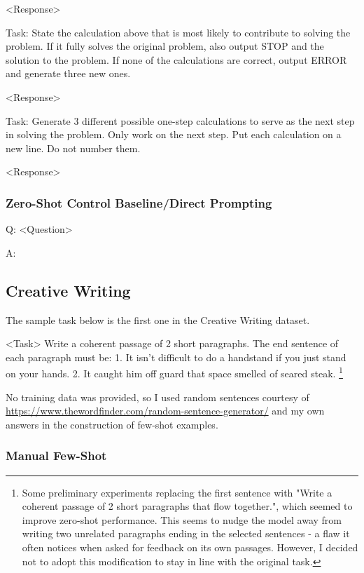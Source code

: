 \documentclass[11pt]{article}
\begin{document}
<Response>

Task: State the calculation above that is most likely to contribute to solving the problem. If it fully solves the original problem, also output STOP and the solution to the problem. If none of the calculations are correct, output ERROR and generate three new ones.

<Response>

Task: Generate 3 different possible one-step calculations to serve as the next step in solving the problem. Only work on the next step. Put each calculation on a new line. Do not number them.

<Response>

\subsubsection*{Zero-Shot Control Baseline/Direct Prompting}

Q: <Question>

A:

\subsection{Creative Writing}

The sample task below is the first one in the Creative Writing dataset. \cite{yao_tree_2023}

<Task> Write a coherent passage of 2 short paragraphs. The end sentence of each paragraph must be: 1. It isn't difficult to do a handstand if you just stand on your hands. 2. It caught him off guard that space smelled of seared steak. \footnote{Some preliminary experiments replacing the first sentence with "Write a coherent passage of 2 short paragraphs that flow together.", which seemed to improve zero-shot performance. This seems to nudge the model away from writing two unrelated paragraphs ending in the selected sentences - a flaw it often notices when asked for feedback on its own passages. However, I decided not to adopt this modification to stay in line with the original task.}

No training data was provided, so I used random sentences courtesy of \url{https://www.thewordfinder.com/random-sentence-generator/} and my own answers in the construction of few-shot examples.

\subsubsection*{Manual Few-Shot}
\end{document}
